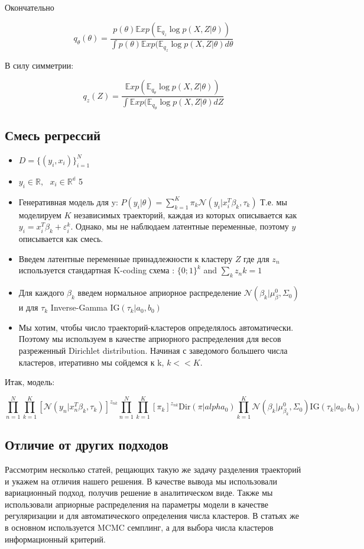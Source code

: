 Окончательно

$$
q_{\theta}(\theta) = \dfrac{p(\theta) \mathbb{E}xp(\mathbb{E}_{q_{z}} \log p(X,Z|\theta))}{\int p(\theta) \mathbb{E}xp(\mathbb{E}_{q_{z}} \log p(X,Z|\theta)d\theta}
$$

В силу симметрии:

$$
q_{z}(Z) = \dfrac{ \mathbb{E}xp(\mathbb{E}_{q_{\theta}} \log p(X,Z|\theta))}{\int \mathbb{E}xp(\mathbb{E}_{q_{\theta}} \log p(X,Z|\theta)dZ}$$
\newpage

\subsection{Смесь регрессий}
\begin{itemize}
\item $D = \{(y_i, x_i)\}_{i=1}^N$
\item $y_i\in\mathbb{R},\text{ }x_i \in\mathbb{R^d}$
5\item Генеративная модель для y: $P(y_i|\theta) = \sum\limits_{k=1}^K\pi_k\mathcal{N}(y_i|x_i^T\beta_k, \tau_k)$ Т.е. мы моделируем $K$ независимых траекторий, каждая из которых описывается как $y_i = x_i^T\beta_k + \varepsilon_i^k$. Однако, мы не наблюдаем латентные переменные, поэтому $y$ описывается как смесь.
\item Введем латентные переменные принадлежности к кластеру $Z$ где для $z_n$ используется стандартная K-coding схема : $\{0;1\}^k$ and $\sum\limits_{k}z_nk = 1$ 
\item Для каждого $\beta_k$ введем нормальное априорное распределение $\mathcal{N}(\beta_k|\mu_{\beta}^0, \Sigma_0)$ и для $\tau_k$  Inverse-Gamma  $\text{IG}(\tau_k|a_0, b_0)$
\item  Мы хотим, чтобы число траекторий-кластеров определялось автоматически. Поэтому мы используем в качестве априорного распределения для весов разреженный Dirichlet distribution. Начиная с заведомого большего числа кластеров, итеративно мы сойдемся к k, $k << K$.
 \end{itemize}

Итак, модель:

$$
\prod\limits_{n=1}^N\prod\limits_{k=1}^K \left[\mathcal{N}(y_n|x_n^T\beta_k, \tau_k)\right]^{z_{nk}}\prod\limits_{n=1}^N\prod\limits_{k=1}^K\left[\pi_k\right]^{z_{nk}}
\text{Dir}(\pi |alpha_0)\prod\limits_{k=1}^K \mathcal{N}(\beta_k|\mu_{\beta_k}^0, \Sigma_0)\text{IG}(\tau_k|a_0, b_0)
$$

\subsection{Отличие от других подходов}
Рассмотрим несколько статей, рещающих такую же задачу разделения траекторий и укажем на отличия нашего решения. В качестве вывода мы использовали вариационный подход, получив решение в аналитическом виде. Также мы использовали априорные распределения на параметры модели в качестве регуляризации и для автоматического определения числа кластеров. В статьях же в основном используется MCMC семплинг, а для выбора числа кластеров информационный критерий.

